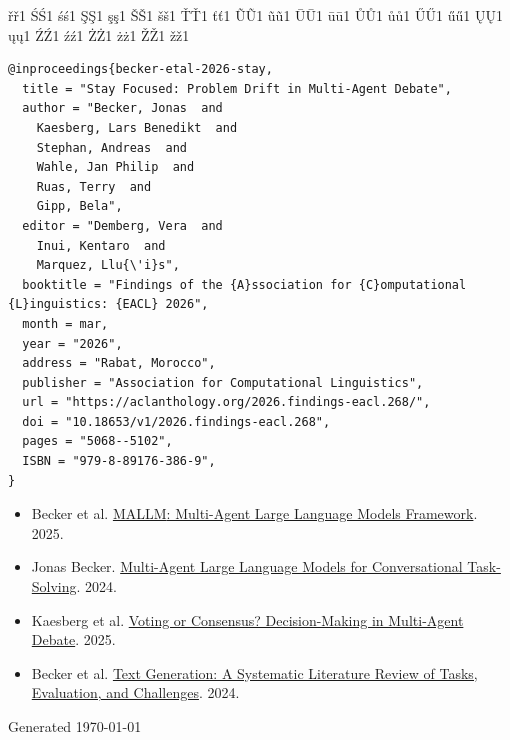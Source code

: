 \begin{tcolorbox}
{      {ř}{{\v{r}}}1  {Ś}{{\'S}}1    {ś}{{\'s}}1    {Ş}{{\c{S}}}1  {ş}{{\c{s}}}1
      {Š}{{\v{S}}}1  {š}{{\v{s}}}1  {Ť}{{\v{T}}}1  {ť}{{\v{t}}}1  {Ũ}{{\~U}}1
      {ũ}{{\~u}}1    {Ū}{{\={U}}}1  {ū}{{\={u}}}1  {Ů}{{\r{U}}}1  {ů}{{\r{u}}}1
      {Ű}{{\H{U}}}1  {ű}{{\H{u}}}1  {Ų}{{\k{U}}}1  {ų}{{\k{u}}}1  {Ź}{{\'Z}}1
      {ź}{{\'z}}1    {Ż}{{\.Z}}1    {ż}{{\.z}}1    {Ž}{{\v{Z}}}1  {ž}{{\v{z}}}1
  }
\begin{lstlisting}
@inproceedings{becker-etal-2026-stay,
  title = "Stay Focused: Problem Drift in Multi-Agent Debate",
  author = "Becker, Jonas  and
    Kaesberg, Lars Benedikt  and
    Stephan, Andreas  and
    Wahle, Jan Philip  and
    Ruas, Terry  and
    Gipp, Bela",
  editor = "Demberg, Vera  and
    Inui, Kentaro  and
    Marquez, Llu{\'i}s",
  booktitle = "Findings of the {A}ssociation for {C}omputational {L}inguistics: {EACL} 2026",
  month = mar,
  year = "2026",
  address = "Rabat, Morocco",
  publisher = "Association for Computational Linguistics",
  url = "https://aclanthology.org/2026.findings-eacl.268/",
  doi = "10.18653/v1/2026.findings-eacl.268",
  pages = "5068--5102",
  ISBN = "979-8-89176-386-9",
}
\end{lstlisting}
\end{tcolorbox}

\vspace{0.8em}
\begin{tcolorbox}[enhanced,
                 frame hidden,
                 boxrule=0pt,
                 borderline west={2pt}{0pt}{Primary},
                 colback=LightBg,
                 sharp corners,
                 breakable,
                 fonttitle=\sffamily\bfseries\large,
                 coltitle=Primary,
                 title=Related Papers,
                 attach title to upper={\vspace{0.2em}\par},
                 left=12pt]
\begin{itemize}\itemsep 2pt
  \item Becker et al. \href{https://aclanthology.org/2025.emnlp-demos.29}{{MALLM}: Multi-Agent Large Language Models Framework}. 2025.
  \item Jonas Becker. \href{https://arxiv.org/abs/2410.22932}{Multi-Agent Large Language Models for Conversational Task-Solving}. 2024. 
  \item Kaesberg et al. \href{https://aclanthology.org/2025.findings-acl.606/}{Voting or Consensus? Decision-Making in Multi-Agent Debate}. 2025.
  \item Becker et al. \href{https://arxiv.org/abs/2405.15604}{Text Generation: A Systematic Literature Review of Tasks, Evaluation, and Challenges}. 2024.
\end{itemize}
\end{tcolorbox}


\vfill
{}
\begin{center}
\small\sffamily\textcolor{TextMuted}{Generated \today}
\end{center}
